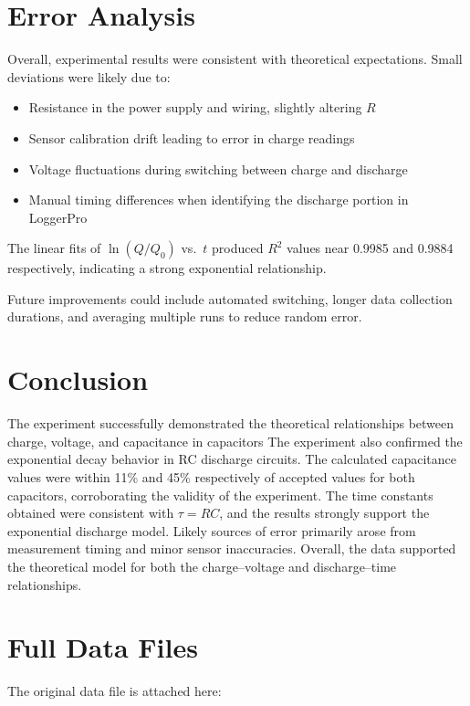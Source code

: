 \documentclass[11pt]{article}
\begin{document}
\section{Error Analysis}
Overall, experimental results were consistent with theoretical expectations.
Small deviations were likely due to:
\begin{itemize}
    \item Resistance in the power supply and wiring, slightly altering $R$
    \item Sensor calibration drift leading to error in charge readings
    \item Voltage fluctuations during switching between charge and discharge
    \item Manual timing differences when identifying the discharge portion in LoggerPro
\end{itemize}
The linear fits of $\ln(Q/Q_0)$ vs.\ $t$ produced $R^2$ values near 0.9985 and 0.9884 respectively, indicating a strong exponential relationship.

Future improvements could include automated switching, longer data collection durations, and averaging multiple runs to reduce random error.

\section{Conclusion}
The experiment successfully demonstrated the theoretical relationships between charge, voltage, and capacitance in capacitors
The experiment also confirmed the exponential decay behavior in RC discharge circuits.
The calculated capacitance values were within 11\% and 45\% respectively of accepted values for both capacitors, corroborating the validity of the experiment.
The time constants obtained were consistent with $\tau = RC$, and the results strongly support the exponential discharge model.
Likely sources of error primarily arose from measurement timing and minor sensor inaccuracies.
Overall, the data supported the theoretical model for both the charge–voltage and discharge–time relationships.

\appendix
\section{Full Data Files}
\noindent The original data file is attached here: 
\end{document}
